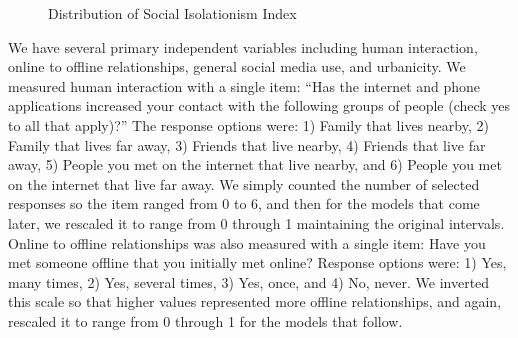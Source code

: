\documentclass[]{interact}
\theoremstyle{plain}%
\theoremstyle{definition}
\theoremstyle{remark}
\begin{document}
\begin{figure}


\caption{\label{fig-social-iso-dist}Distribution of Social Isolationism
Index}

\end{figure}%

We have several primary independent variables including human
interaction, online to offline relationships, general social media use,
and urbanicity. We measured human interaction with a single item: ``Has
the internet and phone applications increased your contact with the
following groups of people (check yes to all that apply)?'' The response
options were: 1) Family that lives nearby, 2) Family that lives far
away, 3) Friends that live nearby, 4) Friends that live far away, 5)
People you met on the internet that live nearby, and 6) People you met
on the internet that live far away. We simply counted the number of
selected responses so the item ranged from 0 to 6, and then for the
models that come later, we rescaled it to range from 0 through 1
maintaining the original intervals. Online to offline relationships was
also measured with a single item: Have you met someone offline that you
initially met online? Response options were: 1) Yes, many times, 2) Yes,
several times, 3) Yes, once, and 4) No, never. We inverted this scale so
that higher values represented more offline relationships, and again,
rescaled it to range from 0 through 1 for the models that follow.
\end{document}
